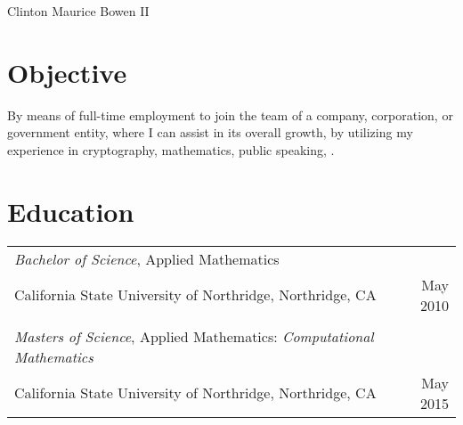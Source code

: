 \documentclass[12pt,table]{article}
\begin{document}
\par{
		{\sffamily\Huge Clinton Maurice Bowen II
	}}\\
 
 
 
\section*{\sffamily Objective}
By means of full-time employment to join the team of a company, corporation,
or government entity, where I can assist in its overall growth, by utilizing my experience in cryptography, mathematics, public speaking, .

\section*{\sffamily Education}

\begin{tabular}{lr}
\textit{Bachelor of Science}, Applied Mathematics&\\
California State University of Northridge, Northridge, CA &May 2010\\
&\\
\textit{Masters of Science}, Applied Mathematics: \textit{Computational Mathematics}&\\
California State University of Northridge, Northridge, CA &May 2015\\
\end{tabular}
\end{document}
